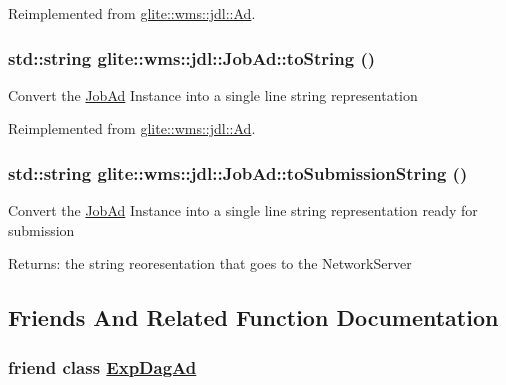 Reimplemented from \hyperlink{classglite_1_1wms_1_1jdl_1_1Ad_z15_1}{glite::wms::jdl::Ad}.\hypertarget{classglite_1_1wms_1_1jdl_1_1JobAd_z3_1}{
\subsubsection[toString]{\setlength{\rightskip}{0pt plus 5cm}std::string glite::wms::jdl::Job\-Ad::to\-String ()}}
\label{classglite_1_1wms_1_1jdl_1_1JobAd_z3_1}


Convert the \hyperlink{classglite_1_1wms_1_1jdl_1_1JobAd}{Job\-Ad} Instance into a single line string representation 

Reimplemented from \hyperlink{classglite_1_1wms_1_1jdl_1_1Ad_z15_0}{glite::wms::jdl::Ad}.\hypertarget{classglite_1_1wms_1_1jdl_1_1JobAd_z3_3}{
\subsubsection[toSubmissionString]{\setlength{\rightskip}{0pt plus 5cm}std::string glite::wms::jdl::Job\-Ad::to\-Submission\-String ()}}
\label{classglite_1_1wms_1_1jdl_1_1JobAd_z3_3}


Convert the \hyperlink{classglite_1_1wms_1_1jdl_1_1JobAd}{Job\-Ad} Instance into a single line string representation ready for submission \begin{Desc}
\item[Returns:]the string reoresentation that goes to the Network\-Server \end{Desc}


\subsection{Friends And Related Function Documentation}
\hypertarget{classglite_1_1wms_1_1jdl_1_1JobAd_n1}{
\subsubsection[ExpDagAd]{\setlength{\rightskip}{0pt plus 5cm}friend class \hyperlink{classglite_1_1wms_1_1jdl_1_1ExpDagAd}{Exp\-Dag\-Ad}}}
\label{classglite_1_1wms_1_1jdl_1_1JobAd_n1}




